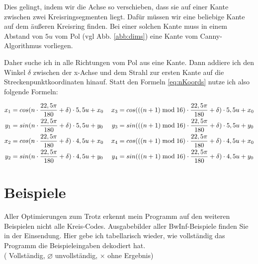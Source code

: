 Dies gelingt, indem wir die Achse so verschieben, dass sie auf einer Kante zwischen zwei Kreisringsegmenten liegt. Dafür müssen wir eine beliebige Kante auf dem äußeren Kreisring finden. Bei einer solchen Kante muss in einem Abstand von \(5u\) vom Pol (vgl Abb. \ref{abb:dims}) eine Kante vom Canny-Algorithmus vorliegen.

Daher suche ich in alle Richtungen vom Pol aus eine Kante. Dann addiere ich den Winkel \(\delta\) zwischen der x-Achse und dem Strahl zur ersten Kante auf die Streckenpunktkoordinaten hinauf. Statt den Formeln \ref{eq:nKoords} nutze ich also folgende Formeln:

\begin{gather}
	\begin{split}
		x_1 &= cos(n \cdot \frac{22,5\pi}{180} + \delta) \cdot 5,5u + x_0\\
		y_1 &= sin(n \cdot \frac{22,5\pi}{180} + \delta) \cdot 5,5u + y_0\\ \vspace{2em}
		x_2 &= cos(n \cdot \frac{22,5\pi}{180} + \delta) \cdot 4,5u + x_0\\
		y_2 &= sin(n \cdot \frac{22,5\pi}{180} + \delta) \cdot 4,5u + y_0
	\end{split}
	\hspace{1.2em}
	\begin{split}
		x_3 &= cos(((n+1)\bmod{}16) \cdot \frac{22,5\pi}{180} + \delta) \cdot 5,5u + x_0\\
		y_3 &= sin(((n+1)\bmod{}16) \cdot \frac{22,5\pi}{180} + \delta) \cdot 5,5u + y_0 \\ \vspace{2em}
		x_4 &= cos(((n+1)\bmod{}16) \cdot \frac{22,5\pi}{180} + \delta) \cdot 4,5u + x_0\\
		y_4 &= sin(((n+1)\bmod{}16) \cdot \frac{22,5\pi}{180} + \delta) \cdot 4,5u + y_0
	\end{split} \label{eq:nKoords}
\end{gather}
\section{Beispiele}
Aller Optimierungen zum Trotz erkennt mein Programm auf den weiteren Beispielen nicht alle Kreis-Codes. Ausgabebilder aller BwInf-Beispiele finden Sie in der Einsendung. Hier gebe ich tabellarisch wieder, wie vollständig das Programm die Beispieleingaben dekodiert hat. \\ 
(\checkmark{} Vollständig, \(\varnothing\) unvollständig, \(\times\) ohne Ergebnis)

